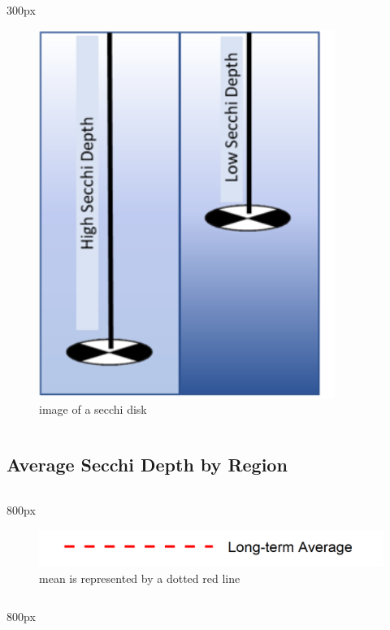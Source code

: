 \documentclass[
]{book}
\begin{document}
\begin{column}{300px\textwidth}
\begin{figure}

{\centering \includegraphics[width=3.79in]{figures/secchidisc} 

}

\caption{image of a secchi disk}\label{fig:unnamed-chunk-6}
\end{figure}
\end{column}

\hypertarget{average-secchi-depth-by-region}{%
\subsection{Average Secchi Depth by Region}\label{average-secchi-depth-by-region}}

\begin{column}{800px\textwidth}
\begin{figure}
\includegraphics[width=15.25in]{figures/mline} \caption{mean is represented by a dotted red line}\label{fig:unnamed-chunk-7}
\end{figure}
\end{column}

\begin{column}{800px\textwidth}
\end{column}
\end{document}
